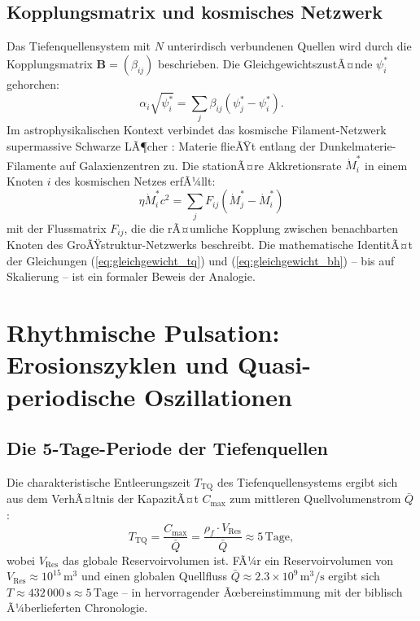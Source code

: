 ﻿\documentclass[12pt,a4paper]{report}
\begin{document}
\subsection{Kopplungsmatrix und kosmisches Netzwerk}

Das Tiefenquellensystem mit $N$ unterirdisch verbundenen Quellen wird durch die Kopplungsmatrix $\mathbf{B} = (\beta_{ij})$ beschrieben. Die GleichgewichtszustÃ¤nde $\psi_i^*$ gehorchen:
\begin{equation}
	\alpha_i \sqrt{\psi_i^*} = \sum_j \beta_{ij}(\psi_j^* - \psi_i^*).
	\label{eq:gleichgewicht_tq}
\end{equation}
Im astrophysikalischen Kontext verbindet das kosmische Filament-Netzwerk supermassive Schwarze LÃ¶cher \cite{bond1996,kormendy2013}: Materie flieÃŸt entlang der Dunkelmaterie-Filamente auf Galaxienzentren zu. Die stationÃ¤re Akkretionsrate $\dot{M}_i^*$ in einem Knoten $i$ des kosmischen Netzes erfÃ¼llt:
\begin{equation}
	\eta \dot{M}_i^* c^2 = \sum_j F_{ij}(\dot{M}_j^* - \dot{M}_i^*)
	\label{eq:gleichgewicht_bh}
\end{equation}
mit der Flussmatrix $F_{ij}$, die die rÃ¤umliche Kopplung zwischen benachbarten Knoten des GroÃŸstruktur-Netzwerks beschreibt. Die mathematische IdentitÃ¤t der Gleichungen (\ref{eq:gleichgewicht_tq}) und (\ref{eq:gleichgewicht_bh}) -- bis auf Skalierung -- ist ein formaler Beweis der Analogie.

\section{Rhythmische Pulsation: Erosionszyklen und Qua\-si-periodische Oszillationen}

\subsection{Die 5-Tage-Periode der Tiefenquellen}

Die charakteristische Entleerungszeit $T_{\mathrm{TQ}}$ des Tiefenquellensystems ergibt sich aus dem VerhÃ¤ltnis der KapazitÃ¤t $C_{\max}$ zum mittleren Quellvolumenstrom $\bar{Q}$:
\begin{equation}
	T_{\mathrm{TQ}} = \frac{C_{\max}}{\bar{Q}} = \frac{\rho_f \cdot V_{\mathrm{Res}}}{\bar{Q}} \approx 5\,\mathrm{Tage},
	\label{eq:tperiod_tq}
\end{equation}
wobei $V_{\mathrm{Res}}$ das globale Reservoirvolumen ist. FÃ¼r ein Reservoirvolumen von $V_{\mathrm{Res}} \approx 10^{15}\,\mathrm{m^3}$ und einen globalen Quellfluss $\bar{Q} \approx 2.3 \times 10^9\,\mathrm{m^3/s}$ ergibt sich $T \approx 432\,000\,\mathrm{s} \approx 5\,\mathrm{Tage}$ -- in hervorragender Ãœbereinstimmung mit der biblisch Ã¼berlieferten Chronologie.
\end{document}
